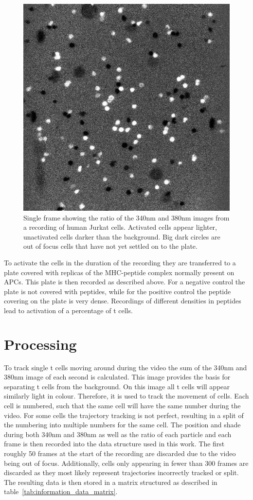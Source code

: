 \begin{figure}
	\centering
	\includegraphics[width=0.6\linewidth]{fig/frame_ratio.jpg}
	\caption{Single frame showing the ratio of the 340nm and 380nm images from a recording of human Jurkat cells. Activated cells appear lighter, unactivated cells darker than the background. Big dark circles are out of focus cells that have not yet settled on to the plate.}
	\label{fig:example_ratio_img}
\end{figure}

To activate the cells in the duration of the recording they are transferred to a plate covered with replicas of the MHC-peptide complex normally present on APCs. This plate is then recorded as described above. For a negative control the plate is not covered with peptides, while for the positive control the peptide covering on the plate is very dense. Recordings of different densities in peptides lead to activation of a percentage of t cells.

\section{Processing}

To track single t cells moving around during the video the sum of the 340nm and 380nm image of each second is calculated. This image provides the basis for separating t cells from the background. On this image all t cells will appear similarly light in colour. Therefore, it is used to track the movement of cells. Each cell is numbered, such that the same cell will have the same number during the video. For some cells the trajectory tracking is not perfect, resulting in a split of the numbering into multiple numbers for the same cell. The position and shade during both 340nm and 380nm as well as the ratio of each particle and each frame is then recorded into the data structure used in this work. The first roughly 50 frames at the start of the recording are discarded due to the video being out of focus. Additionally, cells only appearing in fewer than 300 frames are discarded as they most likely represent trajectories incorrectly tracked or split. The resulting data is then stored in a matrix structured as described in table~\ref{tab:information_data_matrix}.

